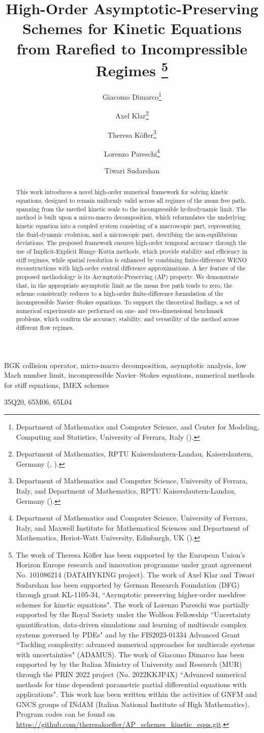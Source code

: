 \documentclass[final,11pt]{siamart251216}
\title {High-Order Asymptotic-Preserving Schemes for Kinetic Equations from Rarefied to Incompressible Regimes \thanks{The work of Theresa K\"{o}fler has been supported by the European Union's Horizon Europe research and innovation programme under grant agreement No. 101086214 (DATAHYKING project).
	The work of Axel Klar and Tiwari Sudarshan has been supported by German Research Foundation (DFG) through grant  KL-1105-34,  ``Asymptotic preserving higher-order  meshfree schemes for kinetic equations".
	The work of Lorenzo Pareschi was partially supported by the Royal Society under the Wolfson Fellowship ``Uncertainty quantification, data-driven simulations and learning of multiscale complex systems governed by PDEs" and by the FIS2023-01334 Advanced Grant ``Tackling complexity: advanced numerical approaches for multiscale systems with uncertainties" (ADAMUS). The work of Giacomo Dimarco has been supported by by the Italian Ministry of University and Research (MUR) through the PRIN 2022 project (No. 2022KKJP4X) ``Advanced numerical methods for time dependent parametric partial differential equations with applications". This work has been written within the activities of GNFM and GNCS groups of INdAM (Italian National Institute of High Mathematics). Program codes can be found on \url{https://github.com/theresakoefler/AP_schemes_kinetic_equs.git}.}}
\author{
  Giacomo Dimarco\thanks{Department of Mathematics and Computer Science, and Center for Modeling, Computing and Statistics, University of Ferrara, Italy (\email{giacomo.dimarco@unife.it}).}
  \and
  Axel Klar\thanks{Department of Mathematics, RPTU Kaiserslautern-Landau, Kaiserslautern, Germany (\email{klar@rptu.de}, \email{tiwari@rptu.de}).}
  \and
  Theresa K\"{o}fler\thanks{Department of Mathematics and Computer Science, University of Ferrara, Italy, and Department of Mathematics, RPTU Kaiserslautern-Landau, Germany (\email{theresa.kofler@unife.it}).}
  \and
  Lorenzo Pareschi\thanks{Department of Mathematics and Computer Science, University of Ferrara, Italy, and Maxwell Institute for Mathematical Sciences and Department of Mathematics, Heriot-Watt University, Edinburgh, UK (\email{l.pareschi@hw.ac.uk}).}
  \and
  Tiwari Sudarshan\footnotemark[3] %
}
\numberwithin{equation}{section}
\theoremstyle{definition}
\theoremstyle{remark}
\begin{document}
\maketitle	
	
	
\begin{abstract} 
This work introduces a novel high-order numerical framework for solving kinetic equations, designed to remain uniformly valid across all regimes of the mean free path, spanning from the rarefied kinetic scale to the incompressible hydrodynamic limit. The method is built upon a micro-macro decomposition, which reformulates the underlying kinetic equation into a coupled system consisting of a macroscopic part, representing the fluid-dynamic evolution, and a microscopic part, describing the non-equilibrium deviations.
The proposed framework ensures high-order temporal accuracy through the use of Implicit-Explicit Runge–Kutta methods, which provide stability and efficiency in stiff regimes, while spatial resolution is enhanced by combining finite-difference WENO reconstructions with high-order central difference approximations. A key feature of the proposed methodology is its Asymptotic-Preserving (AP) property. We demonstrate that, in the appropriate asymptotic limit as the mean free path tends to zero, the scheme consistently reduces to a high-order finite-difference formulation of the incompressible Navier–Stokes equations.
To support the theoretical findings, a set of numerical experiments are performed on one- and two-dimensional benchmark problems, which confirm the accuracy, stability, and versatility of the method across different flow regimes.
\end{abstract}
\begin{keywords}
  BGK collision operator, micro-macro decomposition, asymptotic analysis, low Mach number limit, incompressible Navier--Stokes equations, numerical methods for stiff equations, IMEX schemes
\end{keywords}
\begin{AMS}
  35Q20, 65M06, 65L04
\end{AMS}
\end{document}

